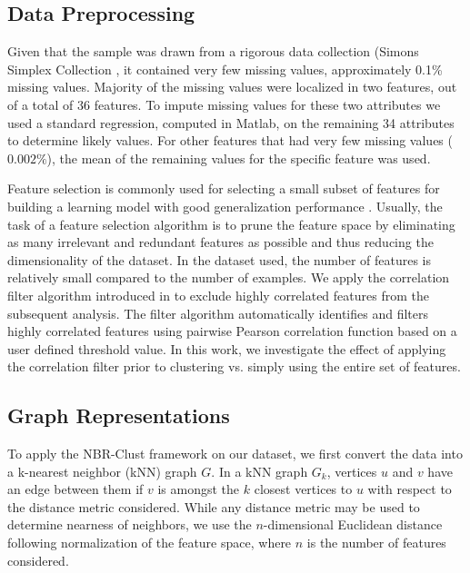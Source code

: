 \documentclass{bmcart}
\begin{document}
\subsection*{Data Preprocessing}
Given that the sample was drawn from a rigorous data collection (Simons Simplex Collection \cite{fischbach2010simons}, it contained very few missing values, approximately 0.1\% missing values.  Majority of the missing values were localized in two features, out of a total of 36 features. To impute missing values for these two attributes we used a standard regression, computed in Matlab, on the remaining 34 attributes to determine likely values. For other features that had very few missing values ($0.002\%$), the mean of the remaining values for the specific feature was used. 

Feature selection is commonly used for selecting a small subset of features for building a learning model with good generalization performance \cite{guyon2003introduction}. Usually, the task of a feature selection algorithm is to prune the feature space by eliminating as many irrelevant and redundant features as possible and thus reducing the dimensionality of the dataset. In the dataset used, the number of features is relatively small compared to the number of examples.
We apply the correlation filter algorithm introduced in  \cite{obafemi2017unified} to exclude highly correlated features from the subsequent analysis. The filter algorithm automatically identifies and filters highly correlated features using pairwise Pearson correlation function based on a user defined threshold value. In this work, we investigate the effect of applying the correlation filter prior to clustering vs. simply using the entire set of features. 

\subsection*{Graph Representations}

To apply the NBR-Clust framework on our dataset, we first convert the data into a k-nearest neighbor (kNN) graph $G$. In a kNN graph $G_k$, vertices $u$ and $v$ have an edge between them if $v$ is amongst the $k$ closest vertices to $u$ with respect to the distance metric considered.  While any distance metric may be used to determine nearness of neighbors, we use the $n$-dimensional Euclidean distance following normalization of the feature space, where $n$ is the number of features considered.
\end{document}
